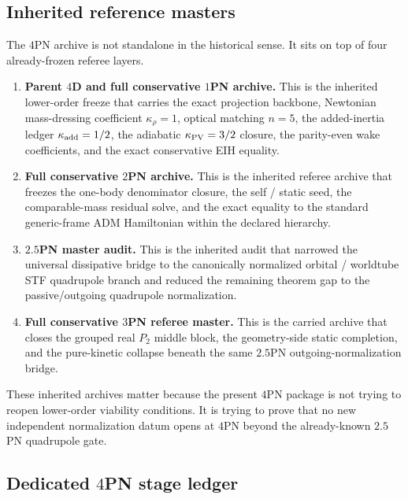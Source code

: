 \documentclass[11pt]{article}
\begin{document}
\subsection{Inherited reference masters}
\label{app:verification-inherited-masters}

The $4$PN archive is not standalone in the historical sense.  It sits on top of
four already-frozen referee layers.

\begin{enumerate}
  \item \textbf{Parent $4$D and full conservative $1$PN archive.}  This is the
  inherited lower-order freeze that carries the exact projection backbone,
  Newtonian mass-dressing coefficient $\kappa_\rho=1$, optical matching
  $n=5$, the added-inertia ledger $\kappa_{\rm add}=1/2$, the adiabatic
  $\kappa_{\rm PV}=3/2$ closure, the parity-even wake coefficients, and the
  exact conservative EIH equality.

  \item \textbf{Full conservative $2$PN archive.}  This is the inherited
  referee archive that freezes the one-body denominator closure, the self /
  static seed, the comparable-mass residual solve, and the exact equality to
  the standard generic-frame ADM Hamiltonian within the declared hierarchy.

  \item \textbf{$2.5$PN master audit.}  This is the inherited audit that
  narrowed the universal dissipative bridge to the canonically normalized
  orbital / worldtube STF quadrupole branch and reduced the remaining theorem
  gap to the passive/outgoing quadrupole normalization.

  \item \textbf{Full conservative $3$PN referee master.}  This is the carried
  archive that closes the grouped real $P_2$ middle block, the geometry-side
  static completion, and the pure-kinetic collapse beneath the same $2.5$PN
  outgoing-normalization bridge.
\end{enumerate}

These inherited archives matter because the present $4$PN package is not trying
to reopen lower-order viability conditions.  It is trying to prove that no new
independent normalization datum opens at $4$PN beyond the already-known
$2.5$PN quadrupole gate.

\subsection{Dedicated \texorpdfstring{$4$}{4}PN stage ledger}
\label{app:verification-4pn-stage-ledger}
\end{document}
